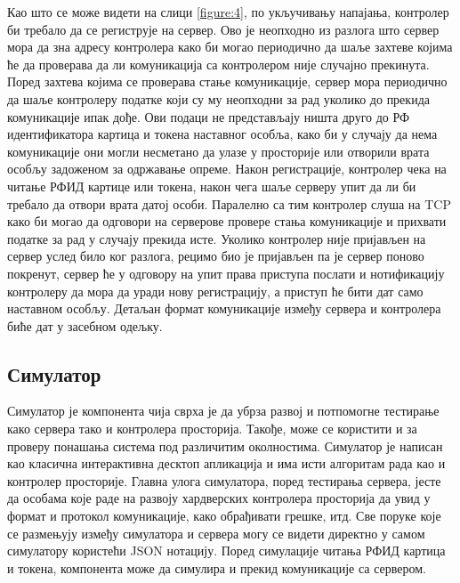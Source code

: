 \documentclass[a4paper, 12pt, diplomski]{etfcyr}
\begin{document}
					\begin{justify}
						Као што се може видети на слици \ref{figure:4}, по укључивању напајања, контролер би требало да се региструје на сервер. Ово је неопходно из разлога што сервер мора да зна адресу контролера како би могао периодично да шаље захтеве којима ће да проверава да ли комуникација са контролером није случајно прекинута. Поред захтева којима се проверава стање комуникације, сервер мора периодично да шаље контролеру податке који су му неопходни за рад уколико до прекида комуникације ипак дође. Ови подаци не представљају ништа друго до РФ идентификатора картица и токена наставног особља, како би у случају да нема комуникације они могли несметано да улазе у просторије или отворили врата особљу задоженом за одржавање опреме.
						Након регистрације, контролер чека на читање РФИД картице или токена, након чега шаље серверу упит да ли би требало да отвори врата датој особи. Паралелно са тим контролер слуша на TCP како би могао да одговори на серверове провере стања комуникације и прихвати податке за рад у случају прекида исте. Уколико контролер није пријављен на сервер услед било ког разлога, рецимо био је пријављен па је сервер поново покренут, сервер ће у одговору на упит права приступа послати и нотификацију контролеру да мора да уради нову регистрацију, а приступ ће бити дат само наставном особљу.
						Детаљан формат комуникације између сервера и контролера биће дат у засебном одељку.
					\end{justify}

			\subsection{Симулатор}
				\begin{justify}
					Симулатор је компонента чија сврха је да убрза развој и потпомогне тестирање како сервера тако и контролера просторија. Такође, може се користити и за проверу понашања система под различитим околностима. Симулатор је написан као класична интерактивна десктоп апликација и има исти алгоритам рада као и контролер просторије. Главна улога симулатора, поред тестирања сервера, јесте да особама које раде на развоју хардверских контролера просторија да увид у формат и протокол комуникације, како обрађивати грешке, итд. Све поруке које се размењују између симулатора и сервера могу се видети директно у самом симулатору користећи JSON нотацију. Поред симулације читања РФИД картица и токена, компонента може да симулира и прекид комуникације са сервером.
				\end{justify}
\end{document}
